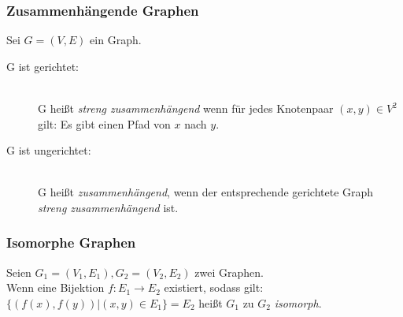\begin{frame}
	\frametitle{Zusammenhängende Graphen}
	\begin{definition}
    Sei $G = (V, E)$ ein Graph.
		\begin{description}
			\item[G ist gerichtet:] \hfill \\
			  G heißt \emph{streng zusammenhängend} wenn für jedes Knotenpaar $(x,y)\in V^2$ gilt: Es gibt einen Pfad von $x$ nach $y$.
			\item[G ist ungerichtet:] \hfill \\
        G heißt \emph{zusammenhängend}, wenn der entsprechende gerichtete Graph \emph{streng zusammenhängend} ist.
		\end{description}
	\end{definition}
\end{frame}

\begin{frame}
	\frametitle{Isomorphe Graphen}
	\begin{definition}
    Seien $G_1 = (V_1, E_1), G_2 = (V_2, E_2)$ zwei Graphen.\\
    Wenn eine Bijektion $f: E_1 \rightarrow E_2$ existiert, sodass gilt:\\
    $\{(f(x), f(y)) | (x, y) \in E_1\} = E_2$ heißt $G_1$ zu $G_2$ \emph{isomorph}.
	\end{definition}
\end{frame}

